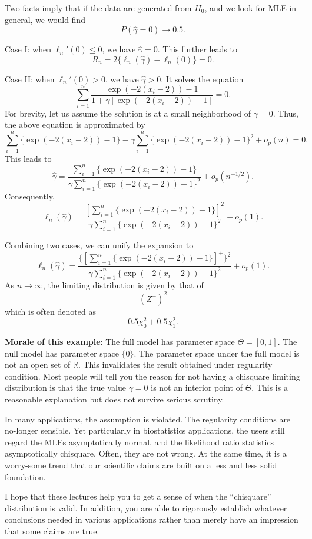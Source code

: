 Two facts imply that if the data are generated from $H_0$, and
we look for MLE in general, we would find
\[
P(\hat \gamma = 0) \to 0.5.
\]

Case I: when $\ell_n'( 0 ) \leq 0$, we have $\hat \gamma = 0$.
This further leads to
\[
R_n = 2 \{ \ell_n(\hat \gamma) - \ell_n(0) \} = 0.
\]

Case II: when $\ell_n'( 0 ) > 0$, we have $\hat \gamma > 0$.
It solves the equation
\[
\sum_{i=1}^n 
\frac{\exp( - 2 (x_i - 2)) - 1}{1 + \gamma [ \exp( - 2 (x_i - 2)) - 1]}=0.
\]
For brevity, let us assume the solution is at a small neighborhood
of $\gamma = 0$.
Thus, the above equation is approximated by
\[
\sum_{i=1}^n \{ \exp( - 2 (x_i - 2)) - 1\}
- \gamma \sum_{i=1}^n \{ \exp( - 2 (x_i - 2)) - 1\}^2 + o_p(n)=0.
\]
This leads to
\[
\hat \gamma 
= 
\frac{\sum_{i=1}^n \{ \exp( - 2 (x_i - 2)) - 1\}}
{\gamma \sum_{i=1}^n \{ \exp( - 2 (x_i - 2)) - 1\}^2}
+ o_p(n^{-1/2}).
\]
Consequently,
\[
\ell_n(\hat \gamma) = \frac{[\sum_{i=1}^n \{ \exp( - 2 (x_i - 2)) - 1\}]^2}
{\gamma \sum_{i=1}^n \{ \exp( - 2 (x_i - 2)) - 1\}^2} + o_p(1).
\]

Combining two cases, we can unify the expansion to
\[
\ell_n(\hat \gamma) 
= \frac{\{[\sum_{i=1}^n \{ \exp( - 2 (x_i - 2)) - 1\}]^+\}^2}
{\gamma \sum_{i=1}^n \{ \exp( - 2 (x_i - 2)) - 1\}^2} + o_p(1).
\]
As $n \to \infty$, the limiting distribution is given by that
of
\[
(Z^+)^2
\]
which is often denoted as 
\[
0.5 \chi_0^2 + 0.5 \chi_1^2.
\]

\vs
{\bf Morale of this example}: The full model has parameter space
$\Theta = [0, 1]$. The null model has parameter space $\{0\}$.
The parameter space under the full model is not an open set of $\mathbb{R}$.  
This invalidates the result obtained under regularity condition.
Most people will tell you the reason for not having a chisquare
limiting distribution is that the true value $\gamma = 0$ is not
an interior point of $\Theta$. This is a reasonable explanation but
does not survive serious scrutiny. 

\vs\vs
In many applications, the \iid assumption is violated.
The regularity conditions are no-longer sensible. 
Yet particularly in biostatistics applications, the users
still regard the MLEs asymptotically normal, and
the likelihood ratio statistics asymptotically chisquare. 
Often, they are not wrong. At the
same time, it is a worry-some trend that our scientific
claims are built on a less and less solid foundation.

I hope that these lectures help you to get a sense
of when the ``chisquare'' distribution is valid.
In addition, you are able to rigorously establish
whatever conclusions needed in various applications
rather than merely have an impression that some claims are true.


